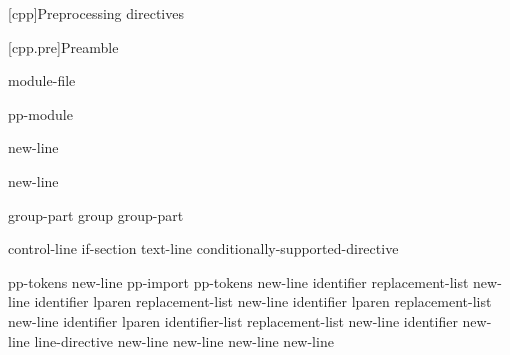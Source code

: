 [cpp]{Preprocessing directives}%

%
%


[cpp.pre]{Preamble}

\begin{bnf}
\br
    \br
    module-file
\end{bnf}

\begin{bnf}
\br
      pp-module  
\end{bnf}

\begin{bnf}
\br
     \terminal{;} new-line 
\end{bnf}

\begin{bnf}
\br
     \terminal{:}  \terminal{;} new-line 
\end{bnf}

\begin{bnf}
\br
    group-part\br
    group group-part
\end{bnf}

\begin{bnf}
\br
    control-line\br
    if-section\br
    text-line\br
    \terminal{\#} conditionally-supported-directive
\end{bnf}

\begin{bnf}
\br
     pp-tokens new-line\br
    pp-import\br
     pp-tokens new-line\br
     identifier replacement-list new-line\br
     identifier lparen  \terminal{)} replacement-list new-line\br
     identifier lparen  replacement-list new-line\br
     identifier lparen identifier-list  replacement-list new-line\br
     identifier new-line\br
    line-directive\br
      new-line\br
      new-line\br
      new-line\br
    \terminal{\# }new-line
\end{bnf}

